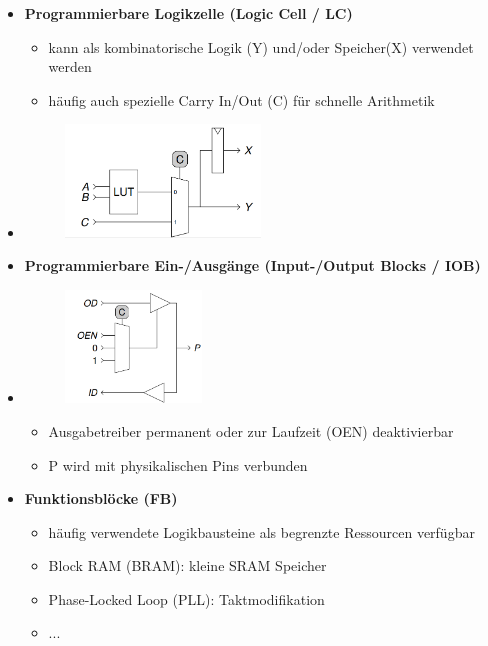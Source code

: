 \documentclass[11pt,a4paper]{article}
\begin{document}
\begin{itemize}
\item \textbf{Programmierbare Logikzelle (Logic Cell / LC)}
	\begin{itemize}
	\item kann als kombinatorische Logik (Y) und/oder Speicher(X) verwendet werden
	\item häufig auch spezielle Carry In/Out (C) für schnelle Arithmetik
	\end{itemize}
\item[]
			\begin{figure}[H]
			\begin{center}
			\includegraphics[height=3cm]{Bilder/logiccell}
			\end{center}
			\end{figure}

\item \textbf{Programmierbare Ein-/Ausgänge (Input-/Output Blocks / IOB)}
\item[]
		\begin{minipage}{0.3\textwidth}
				\begin{figure}[H]
				\includegraphics[height=3cm]{Bilder/iob}
				\end{figure}
			\end{minipage}
			\begin{minipage}[t]{0.6\textwidth}
				\vspace{-1.5cm}
				\begin{itemize}
				\item Ausgabetreiber permanent oder zur Laufzeit (OEN) deaktivierbar
				\item P wird mit physikalischen Pins verbunden
				\end{itemize}
			\end{minipage}

\item \textbf{Funktionsblöcke (FB)}
	\begin{itemize}
	\item häufig verwendete Logikbausteine als begrenzte Ressourcen verfügbar
	\item Block RAM (BRAM): kleine SRAM Speicher
	\item Phase-Locked Loop (PLL): Taktmodifikation
	\item ...
	\end{itemize}

\end{itemize}
\end{document}
